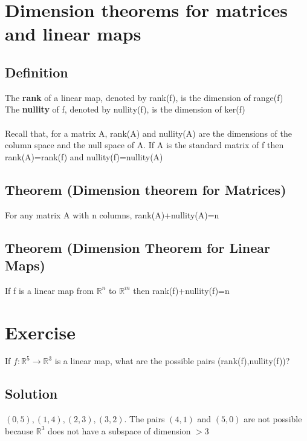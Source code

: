 \documentclass{article}[18pt]
\begin{document}
\section{Dimension theorems for matrices and linear maps}
\subsection{Definition}
The \textbf{rank} of a linear map, denoted by rank(f), is the dimension of range(f)\\
The \textbf{nullity} of f, denoted by nullity(f), is the dimension of ker(f)\\
\\
Recall that, for a matrix A, rank(A) and nullity(A) are the dimensions of the column space and the null space of A. If A is the standard matrix of f then rank(A)=rank(f) and nullity(f)=nullity(A)
\subsection{Theorem (Dimension theorem for Matrices)}
For any matrix A with n columns, rank(A)+nullity(A)=n
\subsection{Theorem (Dimension Theorem for Linear Maps)}
If f is a linear map from $\mathbb{ R }^n$ to $\mathbb{ R }^m$ then rank(f)+nullity(f)=n
\section{Exercise}
If $f:\mathbb{ R }^5\rightarrow \mathbb{ R }^3$ is a linear map, what are the possible pairs (rank(f),nullity(f))?
\subsection{Solution}
$(0,5),(1,4),(2,3),(3,2)$. The pairs $(4,1)$ and $(5,0)$ are not possible because $\mathbb{ R }^3$ does not have a subspace of dimension $>3$
\end{document}
